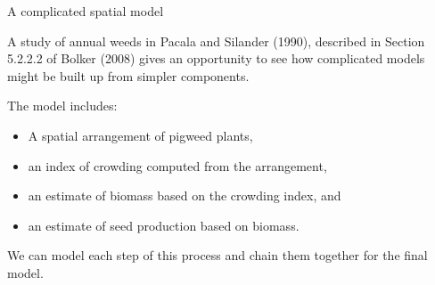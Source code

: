 \documentclass[
  ignorenonframetext,
]{beamer}
\providecommand{\tightlist}{%
  \setlength{\itemsep}{0pt}\setlength{\parskip}{0pt}}
\begin{document}
\begin{frame}{A complicated spatial model}
\protect\hypertarget{a-complicated-spatial-model}{}

A study of annual weeds in Pacala and Silander (1990), described in
Section 5.2.2.2 of Bolker (2008) gives an opportunity to see how
complicated models might be built up from simpler components.

The model includes:

\begin{itemize}
\tightlist
\item
  A spatial arrangement of pigweed plants,
\item
  an index of crowding computed from the arrangement,
\item
  an estimate of biomass based on the crowding index, and
\item
  an estimate of seed production based on biomass.
\end{itemize}

We can model each step of this process and chain them together for the
final model.

\end{frame}
\end{document}
